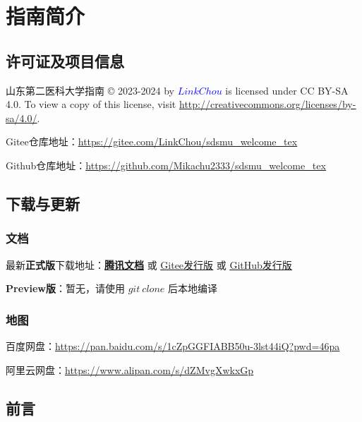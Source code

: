 \chapter[指南简介]{指南简介}

\section[许可证及项目信息]{许可证及项目信息}
山东第二医科大学指南 © 2023-2024 by \textcolor{blue}{$LinkChou$} is licensed under CC BY-SA 4.0. To view a copy of this license, visit \uline{\href{http://creativecommons.org/licenses/by-sa/4.0/}{http://creativecommons.org/licenses/by-sa/4.0/}}.

Gitee仓库地址：\uline{\href{https://gitee.com/LinkChou/sdsmu_welcome_tex}{https://gitee.com/LinkChou/sdsmu\_welcome\_tex}}

Github仓库地址：\uline{\href{https://github.com/Mikachu2333/sdsmu_welcome_tex}{https://github.com/Mikachu2333/sdsmu\_welcome\_tex}}

\section[\textcolor{red}{下载与更新}]{下载与更新}
\subsection{文档}
最新\textbf{正式版}下载地址：\textbf{\uline{\textcolor{red}{\href{https://docs.qq.com/s/ETcQ-ZFSrSsh6MK9bm773q}{腾讯文档}}}} 或 \uline{\href{https://gitee.com/LinkChou/sdsmu_welcome_tex/releases/latest}{Gitee发行版}} 或 \uline{\href{https://github.com/mikachu2333/sdsmu_welcome_tex/releases/latest}{GitHub发行版}}

\textbf{Preview版}\footnotemark：暂无，请使用 $git\ clone$ 后本地编译

\subsection[地图]{地图}
百度网盘：\uline{\href{https://pan.baidu.com/s/1cZpGGFIABB50u-3lst44iQ?pwd=46pa}{https://pan.baidu.com/s/1cZpGGFIABB50u-3lst44iQ?pwd=46pa}}

阿里云网盘：\uline{\href{https://www.alipan.com/s/dZMvgXwkxGp}{https://www.alipan.com/s/dZMvgXwkxGp}}

\section[前言]{前言}
